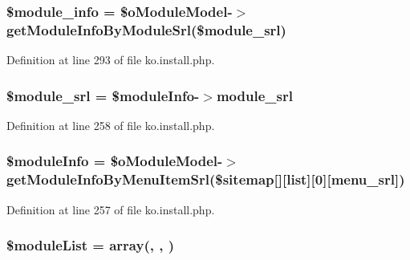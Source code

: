 \subsubsection[{\$module\+\_\+info}]{\setlength{\rightskip}{0pt plus 5cm}\$module\+\_\+info = \$o\+Module\+Model-\/$>$get\+Module\+Info\+By\+Module\+Srl(\${\bf module\+\_\+srl})}\label{ko_8install_8php_a5e701819149f6ea0893d4b79010417d3}


Definition at line 293 of file ko.\+install.\+php.

\hypertarget{ko_8install_8php_ae40aed4d7a99050245e66ca2a82949ed}{}
\subsubsection[{\$module\+\_\+srl}]{\setlength{\rightskip}{0pt plus 5cm}\${\bf module\+\_\+srl} = \$module\+Info-\/$>${\bf module\+\_\+srl}}\label{ko_8install_8php_ae40aed4d7a99050245e66ca2a82949ed}


Definition at line 258 of file ko.\+install.\+php.

\hypertarget{ko_8install_8php_ae3552a6dd49f37a50e7858151f7c5cc2}{}
\subsubsection[{\$module\+Info}]{\setlength{\rightskip}{0pt plus 5cm}\$module\+Info = \$o\+Module\+Model-\/$>$get\+Module\+Info\+By\+Menu\+Item\+Srl(\$sitemap\mbox{[}\textquotesingle{}\mbox{]}\mbox{[}\textquotesingle{}list\textquotesingle{}\mbox{]}\mbox{[}0\mbox{]}\mbox{[}\textquotesingle{}menu\+\_\+srl\textquotesingle{}\mbox{]})}\label{ko_8install_8php_ae3552a6dd49f37a50e7858151f7c5cc2}


Definition at line 257 of file ko.\+install.\+php.

\hypertarget{ko_8install_8php_aaa80946d50e2d3677fbbc6d6c8a643c3}{}
\subsubsection[{\$module\+List}]{\setlength{\rightskip}{0pt plus 5cm}\$module\+List = array(\textquotesingle{}, \textquotesingle{}, \textquotesingle{})}\label{ko_8install_8php_aaa80946d50e2d3677fbbc6d6c8a643c3}


